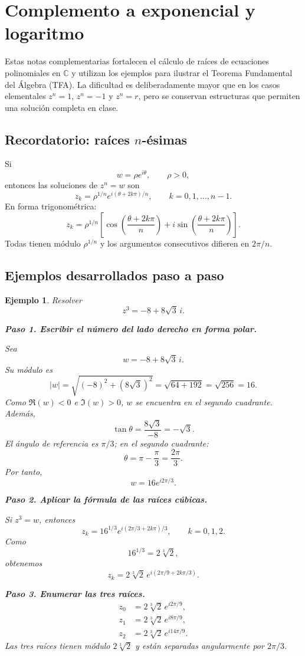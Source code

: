 \documentclass[12pt]{article}
\newtheorem{ejemplo}{Ejemplo}[section]
\newcommand{\C}{\mathbb{C}}
\begin{document}

\section{Complemento a exponencial y logaritmo}


Estas notas complementarias fortalecen el cálculo de raíces de ecuaciones
polinomiales en $\C$ y utilizan los ejemplos para ilustrar el Teorema
Fundamental del Álgebra (TFA). La dificultad es deliberadamente mayor que en
los casos elementales $z^n=1$, $z^n=-1$ y $z^n=r$, pero se conservan
estructuras que permiten una solución completa en clase.

\subsection*{Recordatorio: raíces $n$-ésimas}
Si
\[
w=\rho e^{i\theta},\qquad \rho>0,
\]
entonces las soluciones de $z^n=w$ son
\[
\boxed{z_k=\rho^{1/n}e^{i(\theta+2k\pi)/n}},
\qquad k=0,1,\ldots,n-1.
\]
En forma trigonométrica:
\[
z_k=\rho^{1/n}\left[
\cos\left(\frac{\theta+2k\pi}{n}\right)
+i\sin\left(\frac{\theta+2k\pi}{n}\right)\right].
\]
Todas tienen módulo $\rho^{1/n}$ y los argumentos consecutivos difieren en
$2\pi/n$.


\subsection*{Ejemplos desarrollados paso a paso}

\begin{ejemplo}
Resolver
\[
z^3=-8+8\sqrt3\,i.
\]

\textbf{Paso 1. Escribir el número del lado derecho en forma polar.}

Sea
\[
w=-8+8\sqrt3\,i.
\]
Su módulo es
\[
|w|=\sqrt{(-8)^2+(8\sqrt3)^2}
=\sqrt{64+192}
=\sqrt{256}=16.
\]
Como $\Re(w)<0$ e $\Im(w)>0$, $w$ se encuentra en el segundo cuadrante.
Además,
\[
\tan\theta=\frac{8\sqrt3}{-8}=-\sqrt3.
\]
El ángulo de referencia es $\pi/3$; en el segundo cuadrante:
\[
\theta=\pi-\frac{\pi}{3}=\frac{2\pi}{3}.
\]
Por tanto,
\[
w=16e^{i2\pi/3}.
\]

\textbf{Paso 2. Aplicar la fórmula de las raíces cúbicas.}

Si $z^3=w$, entonces
\[
z_k=16^{1/3}
e^{i(2\pi/3+2k\pi)/3},
\qquad k=0,1,2.
\]
Como
\[
16^{1/3}=2\sqrt[3]{2},
\]
obtenemos
\[
z_k=2\sqrt[3]{2}\,
e^{i(2\pi/9+2k\pi/3)}.
\]

\textbf{Paso 3. Enumerar las tres raíces.}
\[
\boxed{
\begin{aligned}
z_0&=2\sqrt[3]{2}\,e^{i2\pi/9},\\
z_1&=2\sqrt[3]{2}\,e^{i8\pi/9},\\
z_2&=2\sqrt[3]{2}\,e^{i14\pi/9}.
\end{aligned}}
\]
Las tres raíces tienen módulo $2\sqrt[3]{2}$ y están separadas angularmente por
$2\pi/3$.
\end{ejemplo}
\end{document}
